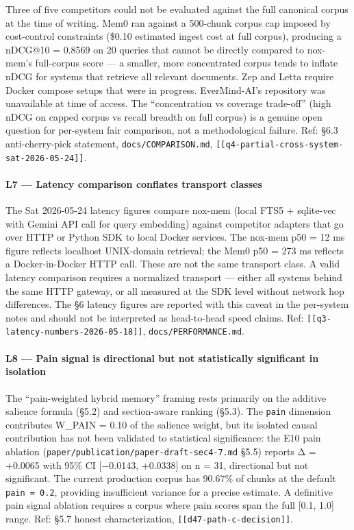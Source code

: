 \documentclass[
]{article}
\begin{document}
Three of five competitors could not be evaluated against the full
canonical corpus at the time of writing. Mem0 ran against a 500-chunk
corpus cap imposed by cost-control constraints (\$0.10 estimated ingest
cost at full corpus), producing a nDCG@10 = 0.8569 on 20 queries that
cannot be directly compared to nox-mem's full-corpus score --- a
smaller, more concentrated corpus tends to inflate nDCG for systems that
retrieve all relevant documents. Zep and Letta require Docker compose
setups that were in progress. EverMind-AI's repository was unavailable
at time of access. The ``concentration vs coverage trade-off'' (high
nDCG on capped corpus vs recall breadth on full corpus) is a genuine
open question for per-system fair comparison, not a methodological
failure. Ref: §6.3 anti-cherry-pick statement,
\texttt{docs/COMPARISON.md},
\texttt{{[}{[}q4-partial-cross-system-sat-2026-05-24{]}{]}}.

\paragraph{L7 --- Latency comparison conflates transport
classes}\label{l7-latency-comparison-conflates-transport-classes}

The Sat 2026-05-24 latency figures compare nox-mem (local FTS5 +
sqlite-vec with Gemini API call for query embedding) against competitor
adapters that go over HTTP or Python SDK to local Docker services. The
nox-mem p50 = 12 ms figure reflects localhost UNIX-domain retrieval; the
Mem0 p50 = 273 ms reflects a Docker-in-Docker HTTP call. These are not
the same transport class. A valid latency comparison requires a
normalized transport --- either all systems behind the same HTTP
gateway, or all measured at the SDK level without network hop
differences. The §6 latency figures are reported with this caveat in the
per-system notes and should not be interpreted as head-to-head speed
claims. Ref: \texttt{{[}{[}q3-latency-numbers-2026-05-18{]}{]}},
\texttt{docs/PERFORMANCE.md}.

\paragraph{L8 --- Pain signal is directional but not statistically
significant in
isolation}\label{l8-pain-signal-is-directional-but-not-statistically-significant-in-isolation}

The ``pain-weighted hybrid memory'' framing rests primarily on the
additive salience formula (§5.2) and section-aware ranking (§5.3). The
\texttt{pain} dimension contributes W\_PAIN = 0.10 of the salience
weight, but its isolated causal contribution has not been validated to
statistical significance: the E10 pain ablation
(\texttt{paper/publication/paper-draft-sec4-7.md} §5.5) reports Δ =
+0.0065 with 95\% CI {[}−0.0143, +0.0338{]} on n = 31, directional but
not significant. The current production corpus has 90.67\% of chunks at
the default \texttt{pain\ =\ 0.2}, providing insufficient variance for a
precise estimate. A definitive pain signal ablation requires a corpus
where pain scores span the full {[}0.1, 1.0{]} range. Ref: §5.7 honest
characterization, \texttt{{[}{[}d47-path-c-decision{]}{]}}.
\end{document}

